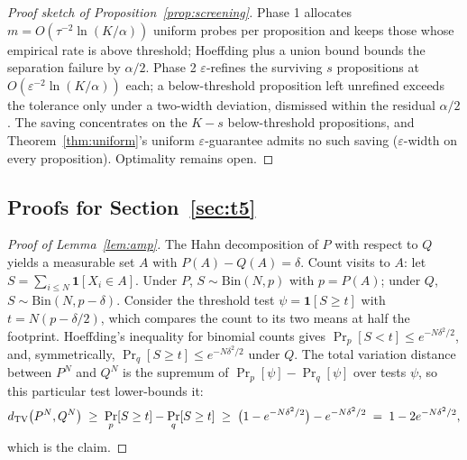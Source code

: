 \begin{proof}[Proof sketch of Proposition~\ref{prop:screening}]
Phase 1 allocates $m=O(\tau^{-2}\ln(K/\alpha))$ uniform probes per
proposition and keeps those whose empirical rate is above threshold;
Hoeffding plus a union bound bounds the separation failure by $\alpha/2$.
Phase 2 $\varepsilon$-refines the surviving $s$ propositions at
$O(\varepsilon^{-2}\ln(K/\alpha))$ each; a below-threshold proposition left
unrefined exceeds the tolerance only under a two-width deviation, dismissed
within the residual $\alpha/2$. The saving concentrates on the $K-s$
below-threshold propositions, and Theorem~\ref{thm:uniform}'s uniform
$\varepsilon$-guarantee admits no such saving ($\varepsilon$-width on every
proposition). Optimality remains open.
\end{proof}

\subsection{Proofs for Section~\ref{sec:t5}}\label{app:t5}

\begin{proof}[Proof of Lemma~\ref{lem:amp}]
The Hahn decomposition of $P$ with respect to $Q$ yields a measurable set $A$
with $P(A)-Q(A)=\delta$. Count visits to $A$: let
$S=\sum_{i\le N}\mathbf{1}[X_i\in A]$. Under $P$,
$S\sim\mathrm{Bin}(N,p)$ with $p=P(A)$; under $Q$,
$S\sim\mathrm{Bin}(N,p-\delta)$. Consider the threshold test
$\psi=\mathbf{1}[S\ge t]$ with $t=N(p-\delta/2)$, which compares the count to
its two means at half the footprint. Hoeffding's inequality for binomial
counts gives $\Pr_p[S<t]\le e^{-N\delta^{2}/2}$, and, symmetrically,
$\Pr_q[S\ge t]\le e^{-N\delta^{2}/2}$ under $Q$.
The total variation distance between $P^{N}$ and $Q^{N}$ is the supremum of
$\Pr_p[\psi]-\Pr_q[\psi]$ over tests $\psi$, so this particular test lower-bounds it:
\[
d_{\mathrm{TV}}\bigl(P^{N},Q^{N}\bigr)\;\ge\;\Pr_p[S\ge t]-\Pr_q[S\ge t]
\;\ge\;\bigl(1-e^{-N\delta^{2}/2}\bigr)-e^{-N\delta^{2}/2}
\;=\;1-2e^{-N\delta^{2}/2},
\]
which is the claim.
\end{proof}

